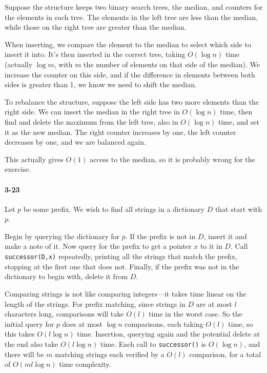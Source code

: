 \documentclass{report}
\begin{document}
Suppose the structure keeps two binary search trees, the median, and counters for the
elements in each tree. The elements in the left tree are less than the median, while
those on the right tree are greater than the median.

When inserting, we compare the element to the median to select which side to insert it
into. It's then inserted in the correct tree, taking $O(\log n)$ time (actually $\log m$,
with $m$ the number of elements on that side of the median). We increase the counter on
this side, and if the difference in elements between both sides is greater than 1, we
know we need to shift the median.

To rebalance the structure, suppose the left side has two more elements than the right
side. We can insert the median in the right tree in $O(\log n)$ time, then find and
delete the maximum from the left tree, also in $O(\log n)$ time, and set it as the new
median. The right counter increases by one, the left counter decreases by one, and we are
balanced again.

This actually gives $O(1)$ access to the median, so it is probably wrong for the exercise.

\paragraph{3-23} Let $p$ be some prefix. We wish to find all strings in a dictionary $D$ that start with $p$.

Begin by querying the dictionary for $p$. If the prefix is not in $D$, insert it and make a note of it. Now query for the prefix to get a pointer $x$ to it in $D$. Call \lstinline!successor(D,x)! repeatedly, printing all the strings that match the prefix, stopping at the first one that does not. Finally, if the prefix was not in the dictionary to begin with, delete it from $D$.

Comparing strings is not like comparing integers---it takes time linear on the length of the strings. For prefix matching, since strings in $D$ are at most $l$ characters long, comparisons will take $O(l)$ time in the worst case. So the initial query for $p$ does at most $\log n$ comparisons, each taking $O(l)$ time, so this takes $O(l\log n)$ time. Insertion, querying again and the potential delete at the end also take $O(l\log n)$ time. Each call to \lstinline!successor()! is $O(\log n)$, and there will be $m$ matching strings each verified by a $O(l)$ comparison, for a total of $O(ml\log n)$ time complexity.
\end{document}
